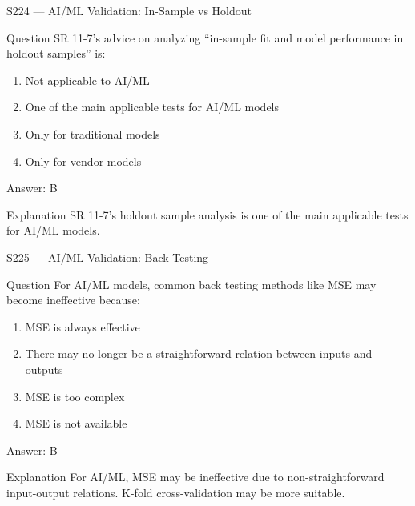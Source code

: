 \documentclass[aspectratio=169,8pt]{beamer}
\begin{document}
\begin{frame}{S224 --- AI/ML Validation: In-Sample vs Holdout}
	\begin{block}{Question}
		SR 11-7's advice on analyzing ``in-sample fit and model performance in holdout samples'' is:
		\begin{enumerate}
			\item Not applicable to AI/ML
			\item One of the main applicable tests for AI/ML models
			\item Only for traditional models
			\item Only for vendor models
		\end{enumerate}
	\end{block}
	\begin{exampleblock}{Answer: B}\end{exampleblock}
	\begin{block}{Explanation}
		SR 11-7's holdout sample analysis is one of the main applicable tests for AI/ML models.
	\end{block}
\end{frame}

\begin{frame}{S225 --- AI/ML Validation: Back Testing}
	\begin{block}{Question}
		For AI/ML models, common back testing methods like MSE may become ineffective because:
		\begin{enumerate}
			\item MSE is always effective
			\item There may no longer be a straightforward relation between inputs and outputs
			\item MSE is too complex
			\item MSE is not available
		\end{enumerate}
	\end{block}
	\begin{exampleblock}{Answer: B}\end{exampleblock}
	\begin{block}{Explanation}
		For AI/ML, MSE may be ineffective due to non-straightforward input-output relations. K-fold cross-validation may be more suitable.
	\end{block}
\end{frame}
\end{document}
